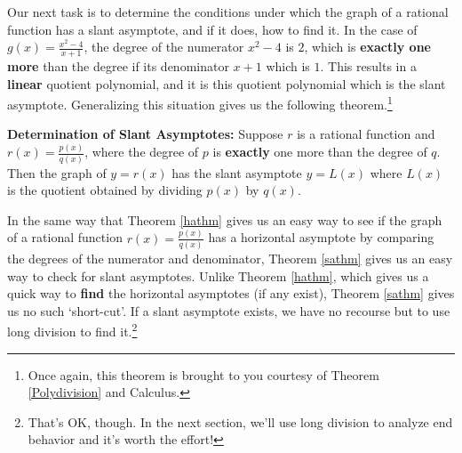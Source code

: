 \documentclass{ximera}
\begin{document}
\medskip


Our next task is to determine the conditions under which the graph of a rational function has a slant asymptote, and if it does, how to find it.  In the case of $g(x) = \frac{x^2-4}{x+1}$, the degree of the numerator $x^2-4$ is $2$, which is \textbf{exactly one more} than the degree if its denominator $x+1$ which is $1$.  This results in a \textbf{linear} quotient polynomial, and it is this quotient polynomial which is the slant asymptote.  Generalizing this situation gives us the following theorem.\footnote{Once again, this theorem is brought to you courtesy of Theorem \ref{Polydivision} and Calculus.}

\medskip

\colorbox{ResultColor}{\bbm

\begin{thm} \textbf{Determination of Slant Asymptotes:} \label{sathm} Suppose $r$ is a rational function and $r(x) = \frac{p(x)}{q(x)}$, where the degree of $p$ is \textbf{exactly} one more than the degree of $q$.  Then the graph of $y=r(x)$ has  the slant asymptote $y=L(x)$ where $L(x)$ is the quotient obtained by dividing $p(x)$ by $q(x)$.

\end{thm}
\ebm}

\medskip

In the same way that Theorem \ref{hathm} gives us an easy way to see if the graph of a rational function $r(x) = \frac{p(x)}{q(x)}$ has a horizontal asymptote by comparing the degrees of the numerator and denominator, Theorem \ref{sathm} gives us an easy way to check for slant asymptotes.  Unlike Theorem \ref{hathm}, which gives us a quick way to \textbf{find} the horizontal asymptotes (if any exist), Theorem \ref{sathm} gives us no such `short-cut'.  If a slant asymptote exists, we have no recourse but to use long division to find it.\footnote{That's OK, though.  In the next section, we'll use long division to analyze end behavior and it's worth the effort!}  
\end{document}
